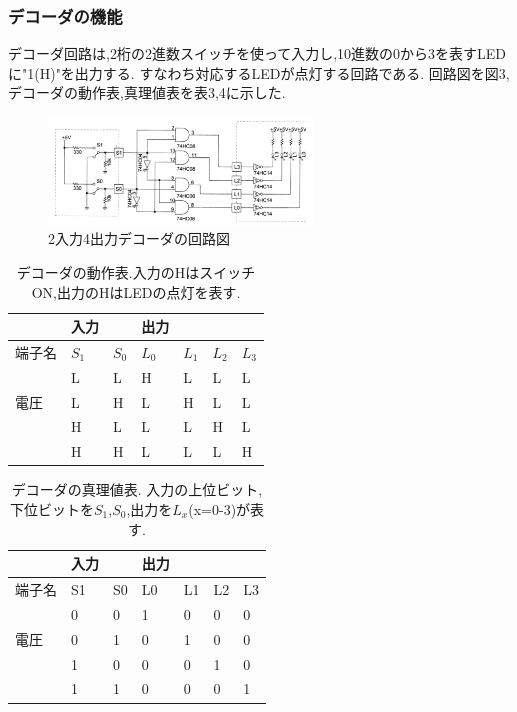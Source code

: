 \documentclass[twocolumn, 10pt,a4j]{jsarticle}
\begin{document}
  \subsubsection{デコーダの機能}
  デコーダ回路は,2桁の2進数スイッチを使って入力し,10進数の0から3を表すLEDに"1(H)"を出力する.
  すなわち対応するLEDが点灯する回路である.
  回路図を図3,デコーダの動作表,真理値表を表3,4に示した.
  \begin{figure}[H]
    \begin{center}
      \includegraphics[width=7cm]{../img/decoda/input2_decoda.png}
      \caption{2入力4出力デコーダの回路図}
    \end{center}
  \end{figure}
  \begin{table}[H]
    \centering
    \caption{デコーダの動作表.入力のHはスイッチON,出力のHはLEDの点灯を表す.}
    \label{my-label}
      \begin{tabular}{l|ll|llll}
          & 入力 &    & 出力 &    &    &    \\ \hline
      端子名 & $S_{1}$ & $S_{0}$ & $L_{0}$ & $L_{1}$ & $L_{2}$ & $L_{3}$ \\ \hline
          & L  & L  & H  & L  & L  & L  \\
      電圧  & L  & H  & L  & H  & L  & L  \\
          & H  & L  & L  & L  & H  & L  \\
          & H  & H  & L  & L  & L  & H 
      \end{tabular}
  \end{table}
  \begin{table}[H]
    \centering
    \caption{デコーダの真理値表.
    入力の上位ビット,下位ビットを$S_{1}$,$S_{0}$,出力を$L_{x}$(x=0-3)が表す.}
    \label{my-label}
      \begin{tabular}{l|ll|llll}
          & 入力 &    & 出力 &    &    &    \\ \hline
      端子名 & S1 & S0 & L0 & L1 & L2 & L3 \\ \hline
          & 0  & 0  & 1  & 0  & 0  & 0  \\
      電圧  & 0  & 1  & 0  & 1  & 0  & 0  \\
          & 1  & 0  & 0  & 0  & 1  & 0  \\
          & 1  & 1  & 0  & 0  & 0  & 1 
      \end{tabular}
  \end{table}
\end{document}
